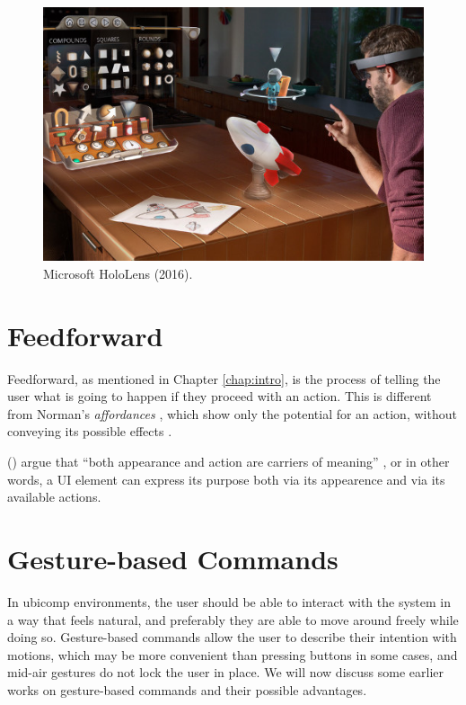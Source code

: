 \begin{figure}
    \centering
    \includegraphics[width=0.8\linewidth]{resources/introduction/hololens.jpg}
    \caption{Microsoft HoloLens (2016).}
    \label{fig:hololens}
\end{figure}

\section{Feedforward} \label{sec:relat:feedforward}
Feedforward, as mentioned in Chapter \ref{chap:intro}, is the process of telling the user what is going to happen if they proceed with an action. This is different from Norman's \textit{affordances} \cite{norman2013design}, which show only the potential for an action, without conveying its possible effects \cite{chueke2016perceptible}.

\citeauthor{djajadiningrat2002but} (\citeyear{djajadiningrat2002but}) argue that ``both appearance and action are carriers of meaning'' \cite{djajadiningrat2002but}, or in other words, a UI element can express its purpose both via its appearence and via its available actions.


\section{Gesture-based Commands} \label{sec:relat:gesture-based_commands}
In ubicomp environments, the user should be able to interact with the system in a way that feels natural, and preferably they are able to move around freely while doing so. Gesture-based commands allow the user to describe their intention with motions, which may be more convenient than pressing buttons in some cases, and mid-air gestures do not lock the user in place. We will now discuss some earlier works on gesture-based commands and their possible advantages.

